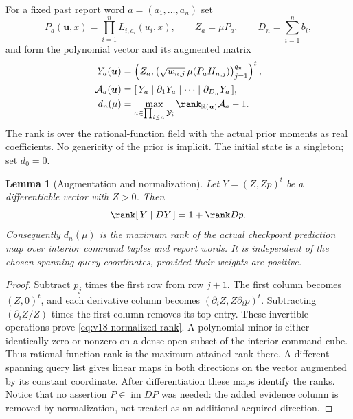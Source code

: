 \documentclass[11pt]{amsart}
\newtheorem{lemma}[theorem]{Lemma}
\theoremstyle{definition}\newtheorem{definition}[theorem]{Definition}
\theoremstyle{remark}\newtheorem{remark}[theorem]{Remark}
\newcommand{\R}{\mathbb R}\newcommand{\N}{\mathbb N}\newcommand{\C}{\mathbb C}
\begin{document}
For a fixed past report word $a=(a_1,\ldots,a_n)$ set
\[
 P_a(\boldsymbol u,x)=\prod_{i=1}^nL_{i,a_i}(u_i,x),\qquad
 Z_a=\mu P_a,\qquad D_n=\sum_{i=1}^nb_i,
\]
and form the polynomial vector and its augmented matrix
\begin{equation}\label{eq:v18-augmented-matrix}
 \begin{split}
 Y_a(\boldsymbol u)&=
 \left(Z_a,\bigl(\sqrt{w_{n,j}}\,\mu(P_aH_{n,j})\bigr)_{j=1}^{q_n}\right)^t,\\
 \mathcal A_a(\boldsymbol u)&=
 [\,Y_a\mid\partial_1Y_a\mid\cdots\mid\partial_{D_n}Y_a\,],\\
 d_n(\mu)&=\max_{a\in\prod_{i\le n}\mathcal Y_i}
       \rank_{\R(\boldsymbol u)}\mathcal A_a-1.
 \end{split}
\end{equation}
The rank is over the rational-function field with the actual prior
moments as real coefficients. No genericity of the prior is implicit.
The initial state is a singleton; set $d_0=0$.

\begin{lemma}[Augmentation and normalization]\label{lem:v18-normalized-rank}
Let $Y=(Z,Zp)^t$ be a differentiable vector with $Z>0$. Then
\begin{equation}\label{eq:v18-normalized-rank}
 \rank[\,Y\mid DY\,]=1+\rank Dp.
\end{equation}
Consequently $d_n(\mu)$ is the maximum rank of the actual checkpoint
prediction map over interior command tuples and report words. It is
independent of the chosen spanning query coordinates, provided their
weights are positive.
\end{lemma}
\begin{proof}
Subtract $p_j$ times the first row from row $j+1$. The first column
becomes $(Z,0)^t$, and each derivative column becomes
$(\partial_iZ,Z\partial_ip)^t$. Subtracting
$(\partial_iZ/Z)$ times the first column removes its top entry.
These invertible operations prove \eqref{eq:v18-normalized-rank}.
A polynomial minor is either identically zero or nonzero on a dense
open subset of the interior command cube. Thus rational-function rank
is the maximum attained rank there. A different spanning query list
gives linear maps in both directions on the vector augmented by its
constant coordinate. After differentiation these maps identify the
ranks. Notice that no assertion $P\in\operatorname{im}DP$ was needed:
the added evidence column is removed by normalization, not treated as
an additional acquired direction.
\end{proof}
\end{document}
